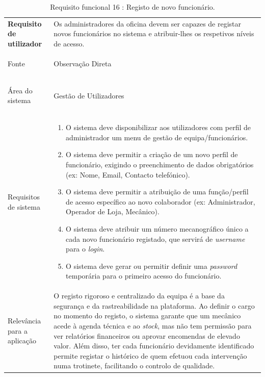 \documentclass[a4paper,12pt]{scrreprt}
\begin{document}
\begin{table}[H]
    \centering
    \renewcommand{\arraystretch}{1.5} 
    
    \begin{tabular}{|>{\columncolor{gray!15}\bfseries}p{4cm}|p{10.5cm}|}
        \hline
        Requisito de utilizador & Os administradores da oficina devem ser capazes de registar novos funcionários no sistema e atribuir-lhes os respetivos níveis de acesso. \\ \hdashline
        
        Fonte & Observação Direta \\ \hdashline
        
        Área do sistema & Gestão de Utilizadores  \\ \hdashline
        
        Requisitos de sistema & 
        \begin{enumerate}[leftmargin=*, nosep, topsep=2pt, partopsep=0pt]
            \item O sistema deve disponibilizar aos utilizadores com perfil de administrador um menu de gestão de equipa/funcionários.
            \item O sistema deve permitir a criação de um novo perfil de funcionário, exigindo o preenchimento de dados obrigatórios (ex: Nome, Email, Contacto telefónico).
            \item O sistema deve permitir a atribuição de uma função/perfil de acesso específico ao novo colaborador (ex: Administrador, Operador de Loja, Mecânico).
            \item O sistema deve atribuir um número mecanográfico único a cada novo funcionário registado, que servirá de \textit{username} para o \textit{login}.
            \item O sistema deve gerar ou permitir definir uma \textit{password} temporária para o primeiro acesso do funcionário.
        \end{enumerate} \\ \hdashline
        
        Relevância para a aplicação & O registo rigoroso e centralizado da equipa é a base da segurança e da rastreabilidade na plataforma. Ao definir o cargo no momento do registo, o sistema garante que um mecânico acede à agenda técnica e ao \textit{stock}, mas não tem permissão para ver relatórios financeiros ou aprovar encomendas de elevado valor. Além disso, ter cada funcionário devidamente identificado permite registar o histórico de quem efetuou cada intervenção numa trotinete, facilitando o controlo de qualidade.\\ \hline
    \end{tabular}
    \caption{Requisito funcional 16 : Registo de novo funcionário.}
    \label{tab:rf_registo_funcionario}
\end{table}
\end{document}
